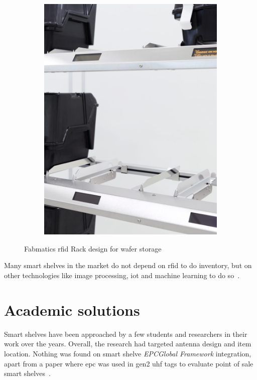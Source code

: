 \begin{figure}[!ht]
\begin{subfigure}{.45\textwidth}
        \includegraphics[width=\linewidth]{./figs/02-state-of-the-art/fabmaticsrfidrack3.jpg}
    \end{subfigure}
    \caption[Fabmatics \ac{rfid} Rack design for wafer storage]{Fabmatics \ac{rfid} Rack design for wafer storage~\cite{RFIDRackFabmatics}} 
    \label{fig:fabmaticsrfidrack}
\end{figure}

Many smart shelves in the market do not depend on \ac{rfid} to do inventory, but on other technologies like image processing, \ac{iot} and machine learning to do so~\cite{TechnologyWiseShelf, RetailSolutionsAWM}.

\section{Academic solutions} \label{sec:academicsolutions}

Smart shelves have been approached by a few students and researchers in their work over the years. Overall, the research had targeted antenna design and item location. Nothing was found on smart shelve \emph{EPCGlobal Framework} integration, apart from a paper where \ac{epc} was used in \ac{gen2} \acs{uhf} tags to evaluate point of sale smart shelves~\cite{sousaSmartShelfRFIDLean2010}.


